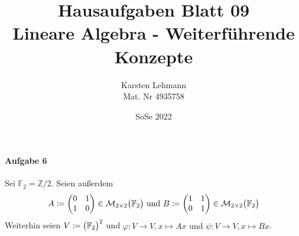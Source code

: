 \documentclass{scrreprt}
\author{Karsten Lehmann\\Mat. Nr 4935758}
\date{SoSe 2022}
\title{Hausaufgaben Blatt 09\\Lineare Algebra - Weiterführende Konzepte}
\begin{document}
\paragraph{Aufgabe 6} Sei $\mathbb{F}_2 = \mathbb{Z} / 2$.
Seien außerdem
\[
  A \coloneqq \begin{pmatrix}
    0 & 1 \\
    1 & 0 \\
  \end{pmatrix} \in \mathcal{M}_{2 \times 2}\qty\big(\mathbb{F}_2)
  \text{ und }
  B \coloneqq \begin{pmatrix}
    1 & 1 \\
    0 & 1 \\
  \end{pmatrix} \in \mathcal{M}_{2 \times 2}\qty\big(\mathbb{F}_2)
\]
Weiterhin seien $V \coloneqq \qty\big(\mathbb{F}_2)^2$ und
$\varphi \colon V \to V, x \mapsto Ax \text{ und }
  \psi \colon V \to V, x \mapsto Bx$.
\end{document}
